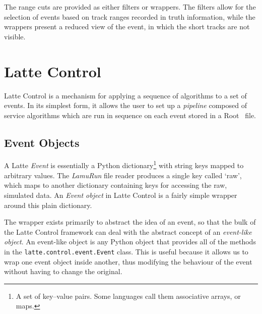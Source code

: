 The range cuts are provided as either filters or wrappers. The filters allow for the selection of events based on track ranges recorded in truth information, while the wrappers present a reduced view of the event, in which the short tracks are not visible.

\section{Latte Control}\label{sec:LatteControl}
Latte Control is a mechanism for applying a sequence of algorithms to a set of events. In its simplest form, it allows the user to set up a \emph{pipeline} composed of service algorithms which are run in sequence on each event stored in a {\sc Root}~\citep{Root} file.

\subsection{Event Objects}
A Latte \emph{Event} is essentially a Python dictionary\footnote{A set of key--value pairs. Some languages call them associative arrays, or maps.} with string keys mapped to arbitrary values. The \emph{LamuRun} file reader produces a single key called `raw', which maps to another dictionary containing keys for accessing the raw, simulated data. An \emph{Event object} in Latte Control is a fairly simple wrapper around this plain dictionary.

The wrapper exists primarily to abstract the idea of an event, so that the bulk of the Latte Control framework can deal with the abstract concept of an \emph{event-like object}. An event-like object is any Python object that provides all of the methods in the \texttt{latte.control.event.Event} class. This is useful because it allows us to wrap one event object inside another, thus modifying the behaviour of the event without having to change the original.

